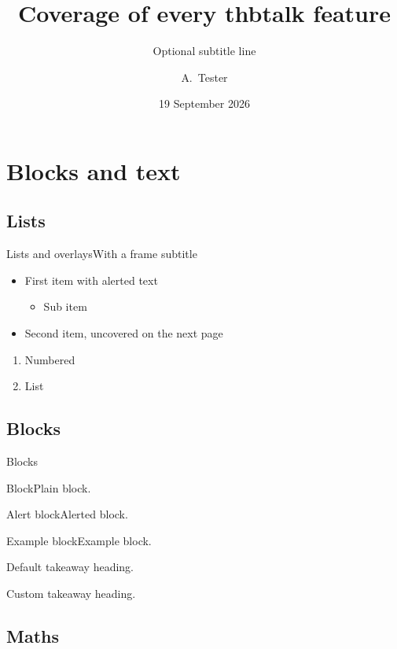 \documentclass[aspectratio=169,10pt]{beamer}
\title{Coverage of every thbtalk feature}
\author{A.~Tester}
\institute{Test Institute}
\date{19 September 2026}   %
\subtitle{Optional subtitle line}%
\begin{document}
\thbtitleframe
\thboutline
\thboutline[2]
\thboutlinecompact
\thboutlinecompact[2]

\section{Blocks and text}
\subsection{Lists}

\begin{frame}{Lists and overlays}{With a frame subtitle}
  \begin{itemize}
    \item First item with \alert{alerted text}
      \begin{itemize}\item Sub item\end{itemize}
    \pause
    \item Second item, uncovered on the next page
  \end{itemize}
  \begin{enumerate}
    \item Numbered
    \item List
  \end{enumerate}
\end{frame}

\subsection{Blocks}

\begin{frame}{Blocks}
  \begin{block}{Block}Plain block.\end{block}
  \begin{alertblock}{Alert block}Alerted block.\end{alertblock}
  \begin{exampleblock}{Example block}Example block.\end{exampleblock}
  \begin{takeaway}Default takeaway heading.\end{takeaway}
  \begin{takeaway}[Custom]Custom takeaway heading.\end{takeaway}
\end{frame}

\subsection{Maths}
\end{document}
